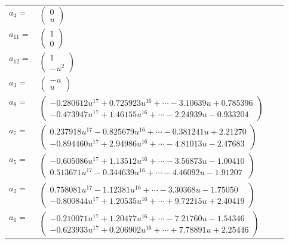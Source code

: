 \documentclass[1p]{elsarticle_modified}
\theoremstyle{definition}
\begin{document}
\begin{tabular}{m{7pt} m{180pt} m{7pt} m{180pt} }
\flushright $a_{4}=$&$\begin{pmatrix}0\\u\end{pmatrix}$ \\
\flushright $a_{11}=$&$\begin{pmatrix}1\\0\end{pmatrix}$ \\
\flushright $a_{12}=$&$\begin{pmatrix}1\\- u^2\end{pmatrix}$ \\
\flushright $a_{3}=$&$\begin{pmatrix}- u\\u\end{pmatrix}$ \\
\flushright $a_{8}=$&$\begin{pmatrix}-0.280612 u^{17}+0.725923 u^{16}+\cdots-3.10639 u+0.785396\\-0.473947 u^{17}+1.46155 u^{16}+\cdots-2.24939 u-0.933204\end{pmatrix}$ \\
\flushright $a_{7}=$&$\begin{pmatrix}0.237918 u^{17}-0.825679 u^{16}+\cdots-0.381241 u+2.21270\\-0.894460 u^{17}+2.94986 u^{16}+\cdots-4.81013 u-2.47683\end{pmatrix}$ \\
\flushright $a_{5}=$&$\begin{pmatrix}-0.605086 u^{17}+1.13512 u^{16}+\cdots-3.56873 u-1.00410\\0.513671 u^{17}-0.344639 u^{16}+\cdots-4.46092 u-1.91207\end{pmatrix}$ \\
\flushright $a_{2}=$&$\begin{pmatrix}0.758081 u^{17}-1.12381 u^{16}+\cdots-3.30368 u-1.75050\\-0.800844 u^{17}+1.20535 u^{16}+\cdots+9.72215 u+2.40419\end{pmatrix}$ \\
\flushright $a_{6}=$&$\begin{pmatrix}-0.210071 u^{17}+1.20477 u^{16}+\cdots-7.21760 u-1.54346\\-0.623933 u^{17}+0.206902 u^{16}+\cdots+7.78891 u+2.25446\end{pmatrix}$ \\

\end{tabular}
\end{document}
